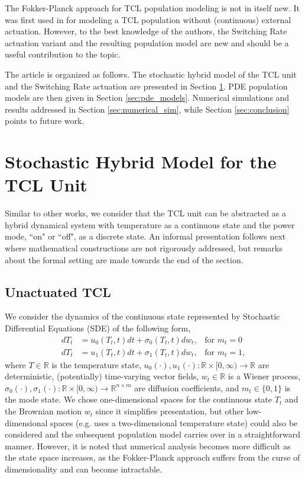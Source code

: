 \documentclass[submission,copyright,creativecommons]{eptcs}
\begin{document}
The Fokker-Planck approach for TCL population modeling is not in itself new. It was first used in \cite{malhame1985electric} for modeling a TCL population without (continuous) external actuation. However, to the best knowledge of the authors, the Switching Rate actuation variant and the resulting population model are new and should be a useful contribution to the topic. 
 
The article is organized as follows. The stochastic hybrid model of the TCL unit and the Switching Rate actuation are presented in Section \ref{sec:SHS}. PDE population models are then given in Section \ref{sec:pde_models}.  Numerical simulations and results addressed in Section \ref{sec:numerical_sim}, while Section \ref{sec:conclusion} points to future work.

\section{Stochastic Hybrid Model for the TCL Unit} \label{sec:SHS}

Similar to other works, we consider that the TCL unit can be abstracted as a hybrid dynamical system with temperature as a continuous state and the power mode, ``on" or ``off", as a discrete state. An informal presentation follows next where mathematical constructions are not rigorously addressed, but remarks about the formal setting are made towards the end of the section. 

\subsection{Unactuated TCL}

We consider the dynamics of the continuous state represented by Stochastic Differential Equations (SDE) of the following form,
\begin{subequations} \label{eq:cont_dyn}
\begin{align} 
 dT_t  &= u_0(T_t,t)dt +  \sigma_0(T_t,t) dw_t, \hspace{10pt} \text{for } m_t=0 \\
 dT_t  &= u_1(T_t,t)dt +  \sigma_1(T_t,t) dw_t, \hspace{10pt} \text{for } m_t=1  ,
\end{align}
\end{subequations} 
where $T \in \mathbb{R}$ is the temperature state, $u_0(\cdot), u_1(\cdot): \mathbb{R}\times[0,\infty) \rightarrow \mathbb{R}$ are deterministic, (potentially) time-varying vector fields, $w_t \in \mathbb{R}$ is a Wiener process, $\sigma_0(\cdot),\sigma_1(\cdot): \mathbb{R}\times[0,\infty) \rightarrow \mathbb{R}^{n\times m}$ are diffusion coefficients, and $m_t \in \{0,1\}$ is the mode state. We chose one-dimensional spaces for the continuous state $T_t$ and the Brownian motion $w_t$ since it simplifies presentation, but other low-dimensional spaces  (e.g. \cite{zhang2013aggregated} uses a two-dimensional temperature state)  could also be considered and the subsequent population model carries over in a straightforward manner. However, it is noted that numerical analysis becomes more difficult as the state space increases, as the Fokker-Planck approach suffers from the curse of dimensionality and can become intractable.
\end{document}
